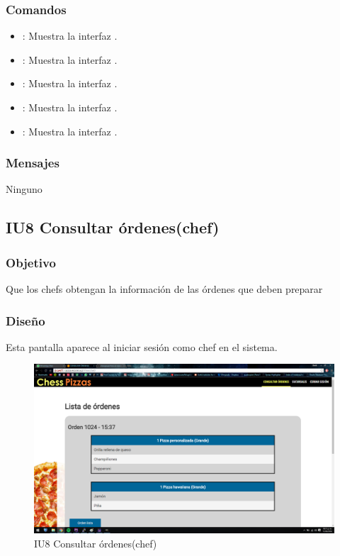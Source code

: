\documentclass[oneside,10pt]{book}
\begin{document}
\subsubsection{Comandos}
\begin{itemize}
	\item {}:  Muestra la interfaz .	
	\item {}:  Muestra la interfaz .	
	\item {}:  Muestra la interfaz .	
	\item {}:  Muestra la interfaz .	
	\item {}:  Muestra la interfaz .	
\end{itemize}

\subsubsection{Mensajes}
Ninguno

\subsection{IU8 Consultar órdenes(chef)}

\subsubsection{Objetivo}
Que los chefs obtengan la información de las órdenes que deben preparar

\subsubsection{Diseño}
Esta pantalla aparece al iniciar sesión como chef en el sistema.

\begin{figure}[htbp!]
	\centering
	\includegraphics[width=1\textwidth]{img/chef}
	\caption{IU8 Consultar órdenes(chef)}
\end{figure}
\end{document}
